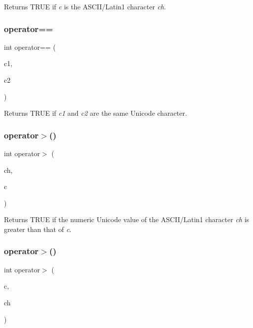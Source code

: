 Returns T\+R\+UE if {\itshape c} is the A\+S\+C\+I\+I/\+Latin1 character {\itshape ch}. \mbox{\label{class_q_char_acf4eb1b3bdf933d74ba2506bac36c5a0}} 
\subsubsection{\texorpdfstring{operator==}{operator==}\hspace{0.1cm}{\footnotesize\ttfamily [3/3]}}
{\footnotesize\ttfamily int operator== (\begin{DoxyParamCaption}\item[{\mbox{\hyperlink{class_q_char}{Q\+Char}}}]{c1,  }\item[{\mbox{\hyperlink{class_q_char}{Q\+Char}}}]{c2 }\end{DoxyParamCaption})\hspace{0.3cm}{\ttfamily [friend]}}

Returns T\+R\+UE if {\itshape c1} and {\itshape c2} are the same Unicode character. \mbox{\label{class_q_char_a73c1424f57eae2e721b34e5e242fa39d}} 
\subsubsection{\texorpdfstring{operator$>$()}{operator>()}\hspace{0.1cm}{\footnotesize\ttfamily [1/3]}}
{\footnotesize\ttfamily int operator$>$ (\begin{DoxyParamCaption}\item[{char}]{ch,  }\item[{\mbox{\hyperlink{class_q_char}{Q\+Char}}}]{c }\end{DoxyParamCaption})\hspace{0.3cm}{\ttfamily [related]}}

Returns T\+R\+UE if the numeric Unicode value of the A\+S\+C\+I\+I/\+Latin1 character {\itshape ch} is greater than that of {\itshape c}. \mbox{\label{class_q_char_a4c094bd4eb0c8476013d9c453278e66a}} 
\subsubsection{\texorpdfstring{operator$>$()}{operator>()}\hspace{0.1cm}{\footnotesize\ttfamily [2/3]}}
{\footnotesize\ttfamily int operator$>$ (\begin{DoxyParamCaption}\item[{\mbox{\hyperlink{class_q_char}{Q\+Char}}}]{c,  }\item[{char}]{ch }\end{DoxyParamCaption})\hspace{0.3cm}{\ttfamily [related]}}

